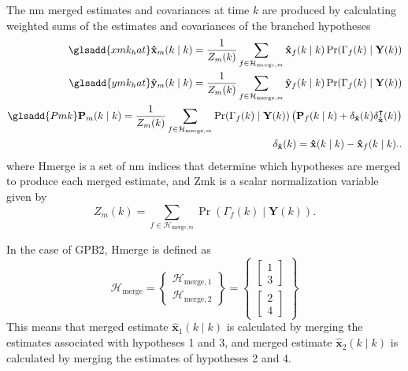 The \gls{nm} merged estimates and covariances at time $k$ are produced by calculating weighted sums of the estimates and covariances of the branched hypotheses
\begin{equation} \label{eq:xmkymk_hat_MKF}
	\begin{aligned}
		\glsadd{xmk_hat}\mathbf{\hat{x}}_m(k \mid k) = \frac{1}{Z_m(k)} \sum_{f \in \mathcal{H}_{\text{merge},m}} \mathbf{\hat{x}}_f(k \mid k) \Pr(\Gamma_f(k) \mid \mathbf{Y}(k)) \\
		\glsadd{ymk_hat}\mathbf{\hat{y}}_m(k \mid k) = \frac{1}{Z_m(k)} \sum_{f \in \mathcal{H}_{\text{merge},m}} \mathbf{\hat{y}}_f(k \mid k) \Pr(\Gamma_f(k) \mid \mathbf{Y}(k)) \\
		\glsadd{Pmk}\mathbf{P}_m(k \mid k) = \frac{1}{Z_m(k)} \sum_{f \in \mathcal{H}_{\text{merge},m}} \Pr(\Gamma_f(k) \mid \mathbf{Y}(k)) \left( \mathbf{P}_f(k \mid k) + \delta_\mathbf{\hat{x}}(k) \delta_\mathbf{\hat{x}}^\intercal(k) \right) \\
		\delta_\mathbf{\hat{x}}(k) = \mathbf{\hat{x}}(k \mid k) - \mathbf{\hat{x}}_f(k \mid k)..
	\end{aligned}
\end{equation}
where \gls{Hmerge} is a set of \gls{nm} indices that determine which hypotheses are merged to produce each merged estimate, and \gls{Zmk} is a scalar normalization variable given by
\begin{equation} \label{eq:Zmk}
	Z_m(k) = \sum_{f \in \mathcal{H}_{\text{merge},m}} \Pr(\Gamma_f(k) \mid \mathbf{Y}(k)).
\end{equation}

In the case of \gls{GPB2}, \gls{Hmerge} is defined as
\begin{equation} \label{eq:Hmerge_GPB2}
	\mathcal{H}_{\text{merge}} = \begin{Bmatrix} \mathcal{H}_{\text{merge},1} \\ \mathcal{H}_{\text{merge},2} \end{Bmatrix} = \begin{Bmatrix}
		\begin{bmatrix}	1 \\ 3 \end{bmatrix} \\
		\begin{bmatrix}	2 \\ 4 \end{bmatrix}
	\end{Bmatrix}
\end{equation}
This means that merged estimate $\mathbf{\hat{x}}_1(k \mid k)$ is calculated by merging the estimates associated with hypotheses 1 and 3, and merged estimate $\mathbf{\hat{x}}_2(k \mid k)$ is calculated by merging the estimates of hypotheses 2 and 4.

